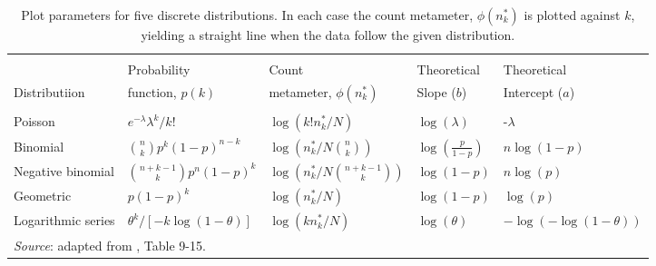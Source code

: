 

\begin{table}[htb]
\caption[Plot parameters for five discrete distributions]{Plot parameters for five discrete distributions. In each case the count metameter, $\phi
(n_k^{*})$ is plotted against $k$, yielding a straight line when the data
follow the given distribution.}
\label{tab:distparms}
 \begin{center}
\begin{tabular}{p{2.4cm}llll}
  \hline\\[.7ex]
   & Probability  & Count  & Theoretical & Theoretical \\
Distributiion & function, $p(k)$ & metameter, $\phi
(n_k^{*})$ & Slope ($b$) & Intercept ($a$)\\[1ex]
  \hline \\[1ex]
Poisson & $e^{-\lambda }\lambda ^k/k!$ & $\log (k!n_k^{*}/N)$ & $\log
(\lambda )$ & -$\lambda $ \\[.7ex]
%
Binomial & $\binom nkp^k(1-p)^{n-k}$ & $\log \left( n_k^{*}/N\binom
nk\right) $ & $\log \left(\frac{p}{1-p}\right)$ & $n\log (1-p)$ \\[.7ex]
%
Negative binomial & $\binom{n+k-1}kp^n(1-p)^k$ & $\log \left( n_k^{*}/N%
\binom{n+k-1}k\right) $ & $\log (1-p)$ & $n\log (p)$ \\[.7ex]
%
Geometric & $p(1-p)^k$ & $\log \left( n_k^{*}/N\right) $ & $\log (1-p)$ & $%
\log (p)$ \\[.7ex]
%
Logarithmic series & $\theta ^k/[-k\log (1-\theta )]$ & $\log \left(
kn_k^{*}/N\right) $ & $\log (\theta )$ & $-\log \left( -\log (1-\theta
)\right) $ \\[1ex]%
  \hline
  \multicolumn{5}{p{\textwidth}}{\emph{Source}: adapted from \citet{HoaglinTukey:85}, Table 9-15.} \\
\end{tabular}
 \end{center}
\end{table}
